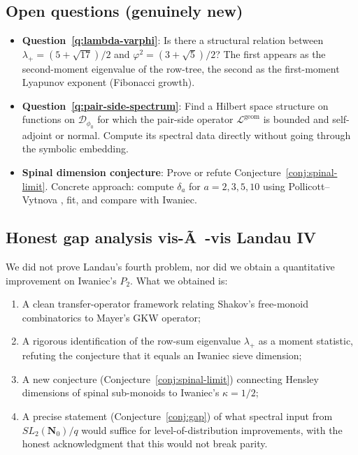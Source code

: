 ﻿\documentclass[11pt]{article}
\theoremstyle{definition}
\newcommand{\Nz}{\mathbf{N}_0}
\newcommand{\SLNz}{SL_2(\Nz)}
\newcommand{\Dphi}{\mathcal{D}_{\phi_0}}
\newcommand{\Lop}{\mathcal{L}}
\begin{document}
\subsection{Open questions (genuinely new)}

\begin{itemize}
\item \textbf{Question~\ref{q:lambda-varphi}}: Is there a structural relation between $\lambda_+=(5+\sqrt{17})/2$ and $\varphi^2=(3+\sqrt{5})/2$? The first appears as the second-moment eigenvalue of the row-tree, the second as the first-moment Lyapunov exponent (Fibonacci growth).
\item \textbf{Question~\ref{q:pair-side-spectrum}}: Find a Hilbert space structure on functions on $\Dphi$ for which the pair-side operator $\Lop^{\mathrm{geom}}$ is bounded and self-adjoint or normal. Compute its spectral data directly without going through the symbolic embedding.
\item \textbf{Spinal dimension conjecture}: Prove or refute Conjecture~\ref{conj:spinal-limit}. Concrete approach: compute $\delta_a$ for $a=2,3,5,10$ using Pollicott--Vytnova \cite{pollicott-vytnova}, fit, and compare with Iwaniec.
\end{itemize}

\subsection{Honest gap analysis vis-Ã -vis Landau IV}

We did not prove Landau's fourth problem, nor did we obtain a quantitative improvement on Iwaniec's $P_2$. What we obtained is:

\begin{enumerate}
\item A clean transfer-operator framework relating Shakov's free-monoid combinatorics to Mayer's GKW operator;
\item A rigorous identification of the row-sum eigenvalue $\lambda_+$ as a moment statistic, refuting the conjecture that it equals an Iwaniec sieve dimension;
\item A new conjecture (Conjecture~\ref{conj:spinal-limit}) connecting Hensley dimensions of spinal sub-monoids to Iwaniec's $\kappa=1/2$;
\item A precise statement (Conjecture~\ref{conj:gap}) of what spectral input from $\SLNz/q$ would suffice for level-of-distribution improvements, with the honest acknowledgment that this would not break parity.
\end{enumerate}
\end{document}
